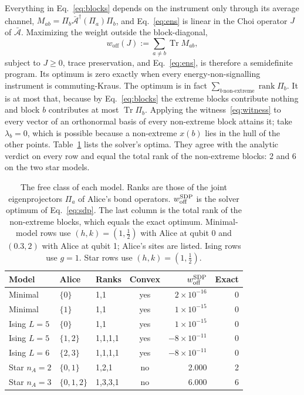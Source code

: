 \documentclass[aps,pra,twocolumn,reprint,superscriptaddress,nofootinbib,floatfix]{revtex4-2}
\theoremstyle{plain}
\theoremstyle{remark}
\newcommand{\Tr}{\operatorname{Tr}}
\newcommand{\Abar}{\bar{\mathcal{A}}}
\begin{document}
Everything in Eq.~\eqref{eq:blocks} depends on the instrument only through its average
channel, $M_{ab}=\Pi_b\Abar^\dagger(\Pi_a)\Pi_b$, and Eq.~\eqref{eq:ens} is linear in the
Choi operator $J$ of $\Abar$. Maximizing the weight outside the block-diagonal,
\begin{equation}
w_{\mathrm{off}}(J):=\sum_{a\neq b}\Tr M_{ab},
\label{eq:sdp}
\end{equation}
subject to $J\ge0$, trace preservation, and Eq.~\eqref{eq:ens}, is therefore a semidefinite
program. Its optimum is zero exactly when every energy-non-signalling instrument is
commuting-Kraus. The optimum is in fact
$\sum_{b\,\text{non-extreme}}\operatorname{rank}\Pi_b$. It is at most that, because by
Eq.~\eqref{eq:blocks} the extreme blocks contribute nothing and block $b$ contributes at most
$\Tr\Pi_b$. Applying the witness~\eqref{eq:witness} to every vector of an orthonormal basis of
every non-extreme block attains it; take $\lambda_b=0$, which is possible because a
non-extreme $x(b)$ lies in the hull of the other points. Table~\ref{tab:freeclass} lists
the solver's optima. They agree with the analytic verdict on every row and equal the total
rank of the non-extreme blocks: 2 and 6 on the two star models.

\begin{table}[t]
\caption{The free class of each model. Ranks are those of the joint eigenprojectors
$\Pi_a$ of Alice's bond operators. $w_{\rm off}^{\rm SDP}$ is the solver optimum of
Eq.~\eqref{eq:sdp}. The last column is the total rank of the non-extreme blocks, which
equals the exact optimum. Minimal-model rows use $(h,k)=(1,\tfrac12)$ with Alice at qubit 0
and $(0.3,2)$ with Alice at qubit 1; Alice's sites are listed. Ising rows use $g=1$. Star rows use $(h,k)=(1,\tfrac12)$.}
\label{tab:freeclass}
\begin{ruledtabular}
\begin{tabular}{lllcrr}
Model & Alice & Ranks & Convex & $w_{\rm off}^{\rm SDP}$ & Exact \\
\hline
Minimal & $\{0\}$ & 1,1 & yes & $2\times10^{-16}$ & 0\\
Minimal & $\{1\}$ & 1,1 & yes & $1\times10^{-15}$ & 0\\
Ising $L=5$ & $\{0\}$ & 1,1 & yes & $1\times10^{-15}$ & 0\\
Ising $L=5$ & $\{1,2\}$ & 1,1,1,1 & yes & $-8\times10^{-11}$ & 0\\
Ising $L=6$ & $\{2,3\}$ & 1,1,1,1 & yes & $-8\times10^{-11}$ & 0\\
Star $n_A=2$ & $\{0,1\}$ & 1,2,1 & no & 2.000 & 2\\
Star $n_A=3$ & $\{0,1,2\}$ & 1,3,3,1 & no & 6.000 & 6\\
\end{tabular}
\end{ruledtabular}
\end{table}
\end{document}
